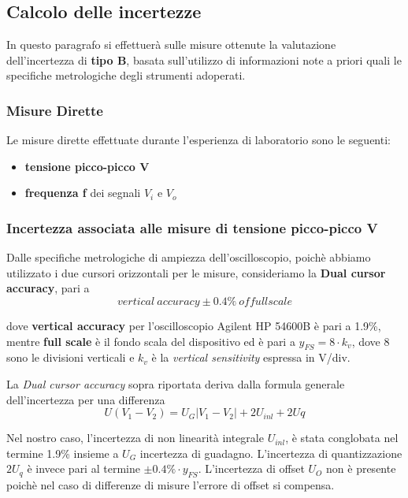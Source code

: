 

\subsection{Calcolo delle incertezze}
In questo paragrafo si effettuerà sulle misure ottenute la valutazione dell'incertezza di \textbf{tipo B}, basata sull'utilizzo di informazioni note a priori quali le specifiche metrologiche degli strumenti adoperati.

\subsubsection{Misure Dirette}

Le misure dirette effettuate durante l'esperienza di laboratorio sono le seguenti:
\begin{itemize}
    \item \textbf{tensione picco-picco V}
    \item \textbf{frequenza f} dei segnali $V_i$ e $V_o$ 
\end{itemize}


\subsubsection*{Incertezza associata alle misure di tensione picco-picco V}

Dalle specifiche metrologiche di ampiezza dell'oscilloscopio, poichè abbiamo utilizzato i due cursori orizzontali per le misure, consideriamo la \textbf{Dual cursor accuracy}, pari a 
\[vertical \ accuracy \pm 0.4\% \ of full scale\]

dove \textbf{vertical accuracy} per l'oscilloscopio Agilent HP 54600B è pari a 1.9\%, mentre \textbf{full scale} è il fondo scala del dispositivo ed è pari a $y_{FS} = 8 \cdot k_v$, dove 8 sono le divisioni verticali e $k_v$ è la \emph{vertical sensitivity} espressa in V/div.

La \emph{Dual cursor accuracy} sopra riportata deriva dalla formula generale dell'incertezza per una differenza 
\[U(V_1 - V_2) = U_G|V_1 - V_2| + 2U_{inl} + 2U{q}\]

Nel nostro caso, l'incertezza di non linearità integrale $U_{inl}$, è stata conglobata nel termine 1.9\% insieme a $U_G$ incertezza di guadagno. L'incertezza di quantizzazione $2U_q$ è invece pari al termine $\pm 0.4\% \cdot y_{FS}$. L'incertezza di offset $U_O$ non è presente poichè nel caso di differenze di misure l'errore di offset si compensa.

